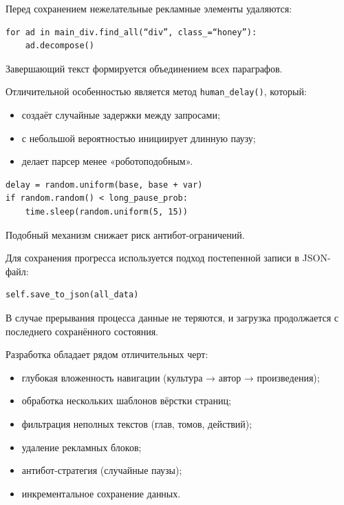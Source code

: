 \documentclass[coursework]{SCWorks}
\begin{document}
    Перед сохранением нежелательные рекламные элементы удаляются:

    \begin{verbatim}
for ad in main_div.find_all(“div”, class_=“honey”):
    ad.decompose()
    \end{verbatim}

    Завершающий текст формируется объединением всех параграфов.

    Отличительной особенностью является метод \texttt{human\_delay()}, который:
    \begin{itemize}
        \item создаёт случайные задержки между запросами;
        \item с небольшой вероятностью инициирует длинную паузу;
        \item делает парсер менее «роботоподобным».
    \end{itemize}

    \begin{verbatim}
delay = random.uniform(base, base + var)
if random.random() < long_pause_prob:
    time.sleep(random.uniform(5, 15))
    \end{verbatim}

    Подобный механизм снижает риск антибот-ограничений.

    Для сохранения прогресса используется подход постепенной записи в JSON-файл:

    \begin{verbatim}
self.save_to_json(all_data)
    \end{verbatim}

    В случае прерывания процесса данные не теряются, и загрузка продолжается с последнего сохранённого состояния.

    Разработка обладает рядом отличительных черт:

    \begin{itemize}
        \item глубокая вложенность навигации (культура → автор → произведения);
        \item обработка нескольких шаблонов вёрстки страниц;
        \item фильтрация неполных текстов (глав, томов, действий);
        \item удаление рекламных блоков;
        \item антибот-стратегия (случайные паузы);
        \item инкрементальное сохранение данных.
    \end{itemize}
\end{document}
